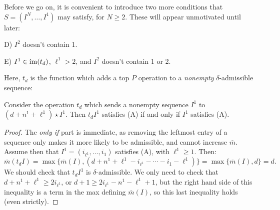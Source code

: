 \documentclass[10pt]{article}
\newcommand{\minDimP}{\overline{m}}
\begin{document}
\begin{SequenceOfSequencesIntro}
Before we go on, it is convenient to introduce two more conditions that $S=(I^N,\ldots,I^1)$ may satisfy, for $N\geq2$. These will appear unmotivated until later:
\begin{itemise}
\setlength{\parindent}{.25in}
\item[D)] $I^2$ doesn't contain 1.
\item[E)] $I^1\in\operatorname{im}(t_d)$, $\ell^1>2$, and $I^2$ doesn't contain 1 or 2.
\end{itemise}
Here, $t_d$ is the function which adds a top $P$ operation to a \emph{nonempty} $\delta$-admissible sequence:
\begin{lem}
Consider the operation $t_d$ which sends a nonempty sequence  $I^1$ to $(d+n^1+\ell^1)\star I^1$. Then $t_dI^1$ satisfies \textup{(A)} if and only if $I^1$ satisfies \textup{(A)}.
\end{lem}
\begin{proof}
The \emph{only if} part is immediate, as removing the leftmost entry of a sequence only makes it more likely to be admissible, and cannot increase $\minDimP$. Assume then that $I^1=(i_{\ell^1},\ldots,i_1)$ satisfies \textup{(A)}, with $\ell^1\geq1$. Then:%
\[\minDimP(t_dI)=\max\{\minDimP(I),(d+n^1+\ell^1-i_{\ell^1}-\cdots -i_1-\ell^1)\}=\max\{\minDimP(I),d\}=d.\]
We should check that $t_dI^1$ is $\delta$-admissible. We only need to check that $d+n^1+\ell^1\geq2i_{\ell^1}$, or $d+1\geq2i_{\ell^1}-n^1-\ell^1+1$, but the right hand side of this inequality is a term in the max defining $\minDimP(I)$, so this last inequality holds (even strictly).
\end{proof}
\end{SequenceOfSequencesIntro}
\end{document}
